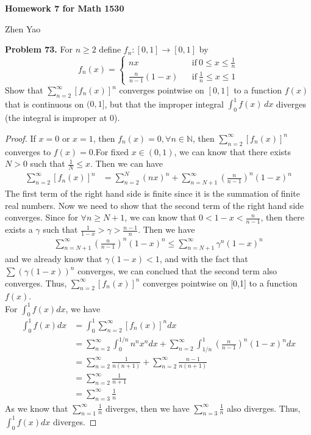 \documentclass[12pt,leqno]{amsart}
\begin{document}
\centerline{\bf Homework 7 for Math 1530}
\centerline{Zhen Yao}

\bigskip

\noindent
{\bf Problem 73.}
For $n\geq 2$ define $f_n: [0,1]\to[0,1]$ by
$$
f_n(x) = \left\{\begin{array}{lcl}
	nx & & \mbox{if}\ 0\leq x\leq \frac{1}{n} \\
	\frac{n}{n-1}(1-x) & & \mbox{if}\ \frac{1}{n} \leq x \leq 1 \end{array}\right.
$$
Show that $\sum_{n=2}^{\infty} \left[f_n(x)\right]^n$ converges pointwise on $[0,1]$ to a function $f(x)$ that is continuous on $(0,1]$, but that the improper integral $\int_0^1 f(x)\,\mathit{dx}$ diverges
(the integral is improper at $0$).
\begin{proof}
If $x = 0$ or $x = 1$, then $f_n(x) = 0, \forall n\in\mathbb{N}$, then $\sum^\infty_{n=2}[f_n(x)]^n$ converges to $f(x) = 0$.For fixed $x\in(0,1)$, we can know that there exists $N > 0$ such that $\frac{1}{N}\leq x$. Then we can have 
\begin{align*}
    \sum^\infty_{n=2}[f_n(x)]^n & = \sum^N_{n=2}(nx)^n + \sum^\infty_{n=N+1} \left(\frac{n}{n-1}\right)^n (1-x)^n
\end{align*}
The first term of the right hand side is finite since it is the summation of finite real numbers. Now we need to show that the second term of the right hand side converges. Since for $\forall n \geq N+1$, we can know that $0< 1 - x < \frac{n}{n-1}$, then there exists a $\gamma$ such that $\frac{1}{1-x}>\gamma>\frac{n-1}{n}$. Then we have 
\begin{align*}
    \sum^\infty_{n=N+1} \left(\frac{n}{n-1}\right)^n (1-x)^n \leq \sum^\infty_{n=N+1}\gamma^n(1-x)^n
\end{align*}
and we already know that $\gamma (1-x) < 1$, and with the fact that $\sum (\gamma (1-x))^n$ converges, we can conclued that the second term also converges. Thus, $\sum^\infty_{n=2}[f_n(x)]^n$ converges pointwise on [0,1] to a function $f(x)$.\\
\hspace*{3em} For $\int_0^1 f(x) \mathit{dx}$, we have 
\begin{align*}
    \int_0^1 f(x) \mathit{dx} & = \int_0^1 \sum_{n=2}^{\infty} \left[f_n(x)\right]^n \mathit{dx} \\
    & = \sum_{n=2}^{\infty} \int_0^{1/n} n^n x^n \mathit{dx} + \sum_{n=2}^{\infty} \int_{1/n}^1 \left(\frac{n}{n-1}\right)^n(1-x)^n \mathit{dx} \\
    & = \sum_{n=2}^{\infty} \frac{1}{n(n+1)} + \sum_{n=2}^{\infty} \frac{n-1}{n(n+1)} \\
    & = \sum_{n=2}^{\infty} \frac{1}{n+1} \\
    & = \sum_{n=3}^{\infty} \frac{1}{n}
\end{align*}
As we know that $\sum^\infty_{n=1}\frac{1}{n}$ diverges, then we have $\sum_{n=3}^{\infty} \frac{1}{n}$ also diverges. Thus, $\int_0^1 f(x) \mathit{dx}$ diverges.
\end{proof} 
\end{document}
